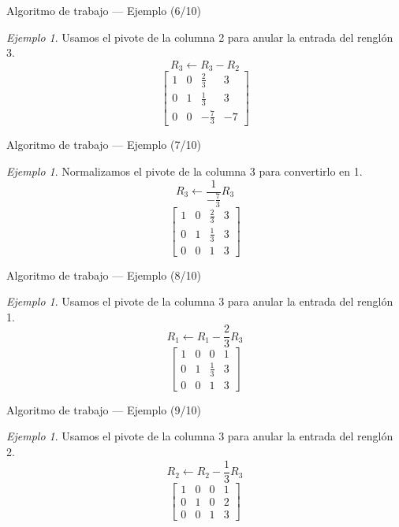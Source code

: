 \documentclass[aspectratio=169,11pt]{beamer}
\theoremstyle{remark}
\newtheorem{Ejem}[definicion]{Ejemplo}
\begin{document}
\begin{frame}{Algoritmo de trabajo — Ejemplo (6/10)}
\begin{Ejem}
Usamos el pivote de la columna 2 para anular la entrada del renglón 3.
\[
R_{3}\leftarrow R_{3}-R_{2}
\]
\[
\left[\begin{array}{ccc|c}
1 & 0 & \frac{2}{3} & 3\\
0 & 1 & \frac{1}{3} & 3\\
0 & 0 & - \frac{7}{3} & -7
\end{array}\right]
\]
\end{Ejem}
\end{frame}

\begin{frame}{Algoritmo de trabajo — Ejemplo (7/10)}
\begin{Ejem}
Normalizamos el pivote de la columna 3 para convertirlo en 1.
\[
R_{3}\leftarrow \frac{1}{- \frac{7}{3}}R_{3}
\]
\[
\left[\begin{array}{ccc|c}
1 & 0 & \frac{2}{3} & 3\\
0 & 1 & \frac{1}{3} & 3\\
0 & 0 & 1 & 3
\end{array}\right]
\]
\end{Ejem}
\end{frame}

\begin{frame}{Algoritmo de trabajo — Ejemplo (8/10)}
\begin{Ejem}
Usamos el pivote de la columna 3 para anular la entrada del renglón 1.
\[
R_{1}\leftarrow R_{1}-\frac{2}{3}R_{3}
\]
\[
\left[\begin{array}{ccc|c}
1 & 0 & 0 & 1\\
0 & 1 & \frac{1}{3} & 3\\
0 & 0 & 1 & 3
\end{array}\right]
\]
\end{Ejem}
\end{frame}

\begin{frame}{Algoritmo de trabajo — Ejemplo (9/10)}
\begin{Ejem}
Usamos el pivote de la columna 3 para anular la entrada del renglón 2.
\[
R_{2}\leftarrow R_{2}-\frac{1}{3}R_{3}
\]
\[
\left[\begin{array}{ccc|c}
1 & 0 & 0 & 1\\
0 & 1 & 0 & 2\\
0 & 0 & 1 & 3
\end{array}\right]
\]
\end{Ejem}
\end{frame}
\end{document}
